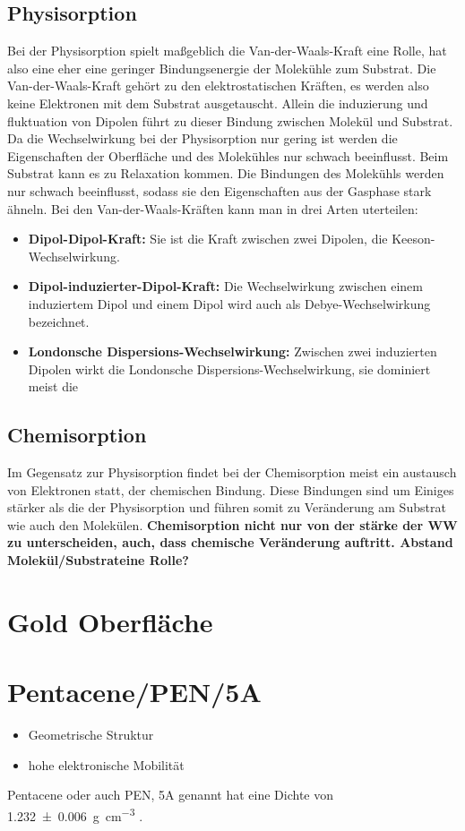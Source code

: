         \subsection{Physisorption}
            Bei der Physisorption spielt maßgeblich die Van-der-Waals-Kraft eine Rolle, hat also eine eher eine geringer Bindungsenergie der Molekühle zum Substrat.
            Die Van-der-Waals-Kraft gehört zu den elektrostatischen Kräften, es werden also keine Elektronen mit dem Substrat ausgetauscht.
            Allein die induzierung und fluktuation von Dipolen führt zu dieser Bindung zwischen Molekül und Substrat.
            Da die Wechselwirkung bei der Physisorption nur gering ist werden die Eigenschaften der Oberfläche und des Molekühles nur schwach beeinflusst.
            Beim Substrat kann es zu Relaxation kommen.
            Die Bindungen des Molekühls werden nur schwach beeinflusst, sodass sie den Eigenschaften aus der Gasphase stark ähneln.
            Bei den Van-der-Waals-Kräften kann man in drei Arten uterteilen:
            \begin{itemize}
                \item \textbf{Dipol-Dipol-Kraft:} Sie ist die Kraft zwischen zwei Dipolen, die Keeson-Wechselwirkung.
                \item \textbf{Dipol-induzierter-Dipol-Kraft:} Die Wechselwirkung zwischen einem induziertem Dipol und einem Dipol wird auch als Debye-Wechselwirkung bezeichnet.
                \item \textbf{Londonsche Dispersions-Wechselwirkung:} Zwischen zwei induzierten Dipolen wirkt die Londonsche Dispersions-Wechselwirkung, sie dominiert meist die 
            \end{itemize}
        
        
        \subsection{Chemisorption}
            Im Gegensatz zur Physisorption findet bei der Chemisorption meist ein austausch von Elektronen statt, der chemischen Bindung.
            Diese Bindungen sind um Einiges stärker als die der Physisorption und führen somit zu Veränderung am Substrat wie auch den Molekülen.
            \textbf{Chemisorption nicht nur von der stärke der WW zu unterscheiden, auch, dass chemische Veränderung auftritt.
            Abstand Molekül/Substrateine Rolle?}
            
    \section{Gold Oberfläche}
        
    \section{Pentacene/PEN/5A}
        \begin{itemize}
            \item Geometrische Struktur
            \item hohe elektronische Mobilität
        \end{itemize}
        Pentacene oder auch PEN, 5A genannt hat eine Dichte von \SI{1.232(6)}{\gram\per\cubic\centi\meter} \cite{CAS}.
    